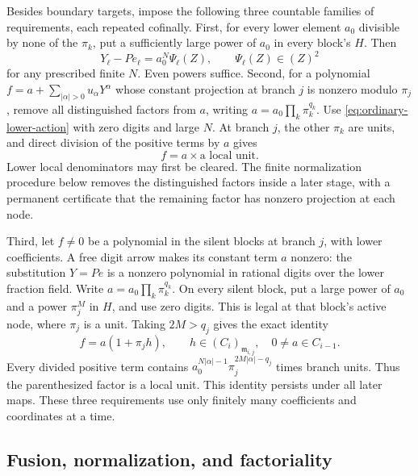 \documentclass[11pt,reqno]{amsart}
\numberwithin{equation}{section}
\theoremstyle{plain}
\theoremstyle{definition}
\theoremstyle{remark}
\begin{document}
Besides boundary targets, impose the following three countable
families of requirements, each repeated cofinally.
First, for every lower element \(a_0\) divisible by none of the
\(\pi_k\), put a sufficiently large power of \(a_0\) in every
block's \(H\). Then
\begin{equation}\label{eq:ordinary-lower-action}
       Y_\ell-Pe_\ell=a_0^N\Psi_\ell(Z),
       \qquad \Psi_\ell(Z)\in(Z)^2
\end{equation}
for any prescribed finite \(N\). Even powers suffice.
Second, for a polynomial
\(f=a+\sum_{|\alpha|>0}u_\alpha Y^\alpha\) whose constant
projection at branch \(j\) is nonzero modulo \(\pi_j\), remove
all distinguished factors from \(a\), writing
\(a=a_0\prod_k\pi_k^{q_k}\). Use
\eqref{eq:ordinary-lower-action} with zero digits and large \(N\).
At branch \(j\), the other \(\pi_k\) are units, and direct division
of the positive terms by \(a\) gives
\begin{equation}\label{eq:ordinary-denominator}
                  f=a\times\text{a local unit}.
\end{equation}
Lower local denominators may first be cleared.
The finite normalization procedure below removes the distinguished
factors inside a later stage, with a permanent certificate that the
remaining factor has nonzero projection at each node.

Third, let \(f\ne0\) be a polynomial in the silent blocks at
branch \(j\), with lower coefficients. A free digit arrow makes
its constant term \(a\) nonzero: the substitution \(Y=Pe\)
is a nonzero polynomial in rational digits over the lower fraction
field. Write \(a=a_0\prod_k\pi_k^{q_k}\). On every silent block,
put a large power of \(a_0\) and a power \(\pi_j^M\) in \(H\),
and use zero digits. This is legal at that block's active node,
where \(\pi_j\) is a unit. Taking \(2M>q_j\) gives the exact
identity
\begin{equation}\label{eq:ordinary-silent}
 f=a(1+\pi_jh),\qquad
 h\in(C_i)_{\mathfrak m_{i,j}},\quad 0\ne a\in C_{i-1}.
\end{equation}
Every divided positive term contains
\(a_0^{N|\alpha|-1}\pi_j^{2M|\alpha|-q_j}\) times branch units.
Thus the parenthesized factor is a local unit. This identity
persists under all later maps. These three requirements use only
finitely many coefficients and coordinates at a time.

\subsection{Fusion, normalization, and factoriality}
\end{document}
